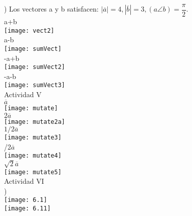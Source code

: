 \documentclass[11pt,a4paper]{article}
\begin{document}
\begin{justify}
) Los vectores a y b satisfacen: $|\overline{a}|=4, |\overline{b}| = 3, (a\angle b) = \dfrac{\pi}{2}$.\\

\noindent
a+b \\

\texttt{[image: vect2]}\\

\noindent
a-b\\

\texttt{[image: sumVect]}\\

\noindent
-a+b\\

\noindent
\texttt{[image: sumVect2]}\\

\noindent
-a-b\\

\noindent
\texttt{[image: sumVect3]}\\


\noindent
Actividad V\\

\noindent
$\overline{a}$\\

\noindent
\texttt{[image: mutate]}\\

\noindent
$2\overline{a}$\\
\texttt{[image: mutate2a]}\\

\noindent
$1/2\overline{a}$\\
\texttt{[image: mutate3]}\\

/2$\overline{a}$\\
\texttt{[image: mutate4]}\\

\noindent
$\sqrt{2}\overline{a}$\\
\texttt{[image: mutate5]}\\


\noindent
Actividad VI \\


) \\

\noindent
\texttt{[image: 6.1]}\\
\texttt{[image: 6.11]}\\



\end{justify}
\end{document}
